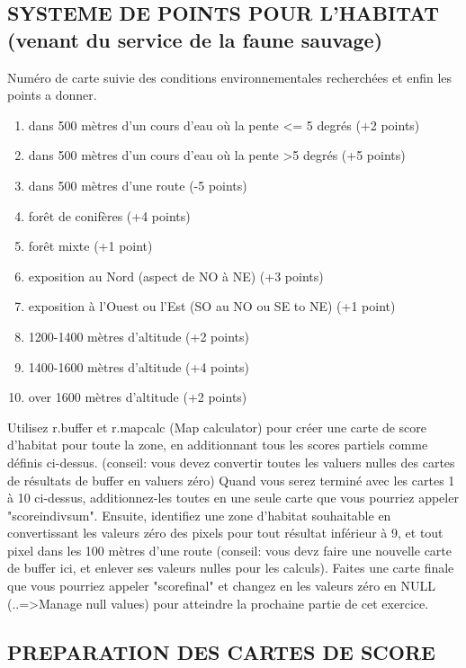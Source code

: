 \subsection{SYSTEME DE POINTS POUR L'HABITAT (venant du service de la faune sauvage) }

Num\'ero de carte suivie des conditions environnementales recherch\'ees et enfin les points a donner.
\begin{enumerate}
\item dans 500 m\`etres d'un cours d'eau o\`u la pente <= 5 degr\'es (+2 points)
\item dans 500 m\`etres d'un cours d'eau o\`u la pente >5 degr\'es (+5 points)
\item dans 500 m\`etres d'une route (-5 points)
\item for\^et de conif\`eres (+4 points)
\item for\^et mixte (+1 point)
\item exposition au Nord (aspect de NO \`a NE) (+3 points)
\item exposition \`a l'Ouest ou l'Est (SO au NO ou SE to NE) (+1 point)
\item 1200-1400 m\`etres d'altitude (+2 points)
\item 1400-1600 m\`etres d'altitude (+4 points)
\item over 1600 m\`etres d'altitude (+2 points)
\end{enumerate}

Utilisez r.buffer et r.mapcalc (Map calculator) pour cr\'eer une carte de score d'habitat pour toute la zone, en additionnant tous les scores partiels comme d\'efinis ci-dessus. (conseil: vous devez convertir toutes les valuers nulles des cartes de r\'esultats de buffer en valuers z\'ero)
Quand vous serez termin\'e avec les cartes 1 \`a 10 ci-dessus, additionnez-les toutes en une seule carte que vous pourriez appeler "scoreindivsum". Ensuite, identifiez une zone d'habitat souhaitable en convertissant les valeurs z\'ero des pixels pour tout r\'esultat inf\'erieur \`a 9, et tout pixel dans les 100 m\`etres d'une route (conseil: vous devz faire une nouvelle carte de buffer ici, et enlever ses valeurs nulles pour les calculs). Faites une carte finale que vous pourriez appeler "scorefinal" et changez en les valeurs z\'ero en NULL (..=>Manage null values) pour atteindre la prochaine partie de cet exercice.

\subsection{PREPARATION DES CARTES DE SCORE}

